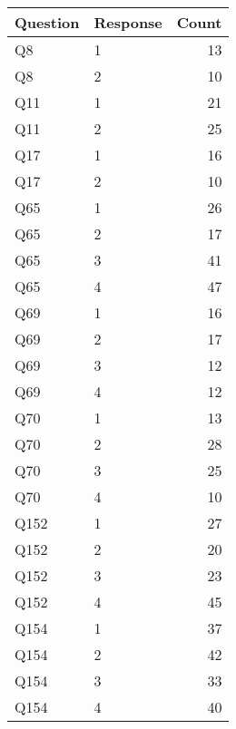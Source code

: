 \begin{tabular}{llr}
\toprule
Question & Response & Count \\
\midrule
Q8 & 1 & 13 \\
Q8 & 2 & 10 \\
Q11 & 1 & 21 \\
Q11 & 2 & 25 \\
Q17 & 1 & 16 \\
Q17 & 2 & 10 \\
Q65 & 1 & 26 \\
Q65 & 2 & 17 \\
Q65 & 3 & 41 \\
Q65 & 4 & 47 \\
Q69 & 1 & 16 \\
Q69 & 2 & 17 \\
Q69 & 3 & 12 \\
Q69 & 4 & 12 \\
Q70 & 1 & 13 \\
Q70 & 2 & 28 \\
Q70 & 3 & 25 \\
Q70 & 4 & 10 \\
Q152 & 1 & 27 \\
Q152 & 2 & 20 \\
Q152 & 3 & 23 \\
Q152 & 4 & 45 \\
Q154 & 1 & 37 \\
Q154 & 2 & 42 \\
Q154 & 3 & 33 \\
Q154 & 4 & 40 \\
\bottomrule
\end{tabular}
